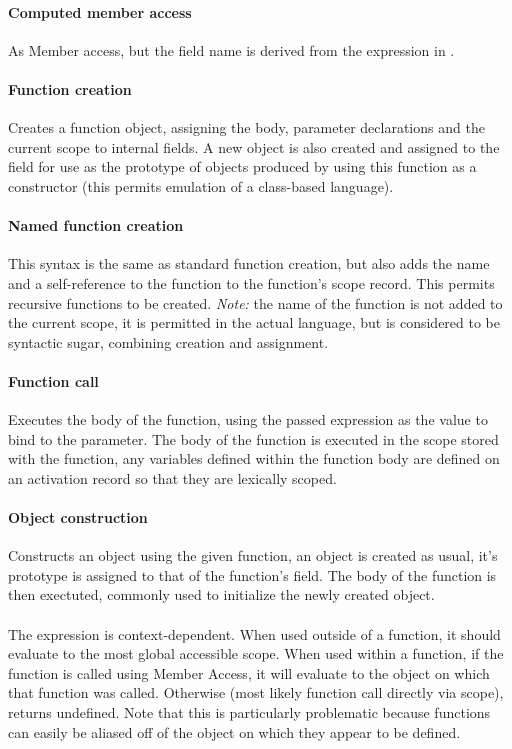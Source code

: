 \documentclass[a4paper]{article}
\begin{document}
\paragraph{Computed member access} As Member access, but the field name is derived from
the expression in \js{[]}.

\paragraph{Function creation} Creates a function object, assigning the body, parameter
declarations and the current scope to internal fields. A new object is also
created and assigned to the  field for use as the prototype of
objects produced by using this function as a constructor (this permits
emulation of a class-based language).

\paragraph{Named function creation} This syntax is the same as standard function creation,
but also adds the name and a self-reference to the function to the function's
scope record. This permits recursive functions to be created. \emph{Note:} the
name of the function is not added to the current scope, it is permitted in the
actual language, but is considered to be syntactic sugar, combining creation and
assignment.

\paragraph{Function call} Executes the body of the function, using the passed expression
as the value to bind to the parameter. The body of the function is executed in
the scope stored with the function, any variables defined within the function
body are defined on an activation record so that they are lexically scoped.

\paragraph{Object construction} Constructs an object using the given function, an object
is created as usual, it's prototype is assigned to that of the function's
 field. The body of the function is then exectuted, commonly used
to initialize the newly created object.

\paragraph{} The  expression is context-dependent. When used
outside of a
function, it should evaluate to the most global accessible scope.
When used within a function, if the function is called using Member Access, it
will evaluate to the object on which that function was called. Otherwise
(most likely function call directly via scope),
 returns undefined. Note that this is particularly
problematic because functions can easily be aliased off of the object on which
they appear to be defined.
\end{document}
